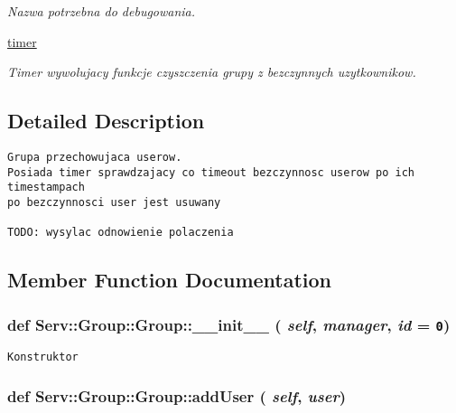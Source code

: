 \begin{CompactItemize}
\begin{CompactList}\small\item\em Nazwa potrzebna do debugowania. \item\end{CompactList}\item 
\hypertarget{class_serv_1_1_group_1_1_group_f32cede000e34bd216170b4969c2e938}{
\hyperlink{class_serv_1_1_group_1_1_group_f32cede000e34bd216170b4969c2e938}{timer}}
\label{class_serv_1_1_group_1_1_group_f32cede000e34bd216170b4969c2e938}

\begin{CompactList}\small\item\em Timer wywolujacy funkcje czyszczenia grupy z bezczynnych uzytkownikow. \item\end{CompactList}\end{CompactItemize}


\subsection{Detailed Description}


\footnotesize\begin{verbatim}Grupa przechowujaca userow.
Posiada timer sprawdzajacy co timeout bezczynnosc userow po ich timestampach
po bezczynnosci user jest usuwany

TODO: wysylac odnowienie polaczenia    
\end{verbatim}
\normalsize
 

\subsection{Member Function Documentation}
\hypertarget{class_serv_1_1_group_1_1_group_ee5bd24c2c39d9c06c11aec410690c3d}{
\subsubsection[{\_\-\_\-init\_\-\_\-}]{\setlength{\rightskip}{0pt plus 5cm}def Serv::Group::Group::\_\-\_\-init\_\-\_\- ( {\em self}, \/   {\em manager}, \/   {\em id} = {\tt 0})}}
\label{class_serv_1_1_group_1_1_group_ee5bd24c2c39d9c06c11aec410690c3d}




\footnotesize\begin{verbatim}Konstruktor\end{verbatim}
\normalsize
 \hypertarget{class_serv_1_1_group_1_1_group_0a4183d2362794bd55741a35e4b5a91d}{
\subsubsection[{addUser}]{\setlength{\rightskip}{0pt plus 5cm}def Serv::Group::Group::addUser ( {\em self}, \/   {\em user})}}
\label{class_serv_1_1_group_1_1_group_0a4183d2362794bd55741a35e4b5a91d}




